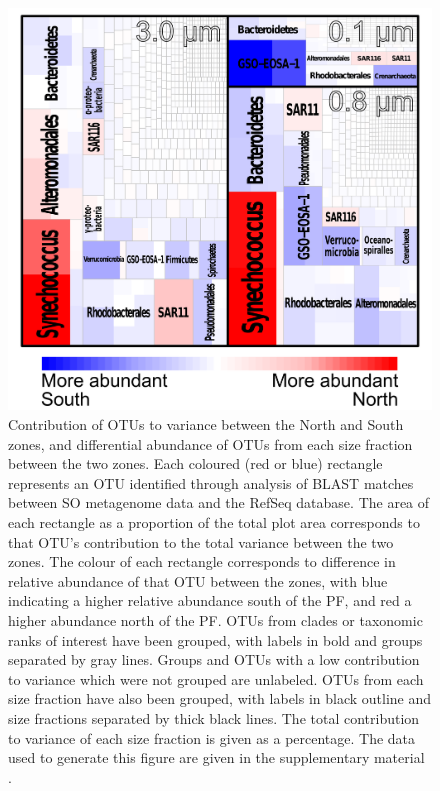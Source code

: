 \begin{figure}
  \centering
  \includegraphics[width=\textwidth]{../polarfront/taxotreemap.png}
  \caption[Contribution of \acp{OTU} to variance between the North and South zones]{Contribution of OTUs to variance between the North and South zones, and differential abundance of OTUs from each size fraction between the two zones.
Each coloured (red or blue) rectangle represents an OTU identified through analysis of BLAST matches between SO metagenome data and the RefSeq database.
The area of each rectangle as a proportion of the total plot area corresponds to that OTU's contribution to the total variance between the two zones.
The colour of each rectangle corresponds to difference in relative abundance of that OTU between the zones, with blue indicating a higher relative abundance south of the PF, and red a higher abundance north of the PF.
OTUs from clades or taxonomic ranks of interest have been grouped, with labels in bold and groups separated by gray lines. 
Groups and OTUs with a low contribution to variance which were not grouped are unlabeled.
OTUs from each size fraction have also been grouped, with labels in black outline and size fractions separated by thick black lines. 
The total contribution to variance of each size fraction is given as a percentage.
The data used to generate this figure are given in the supplementary material .
  }
  \label{fig:taxotreemap}
\end{figure}
